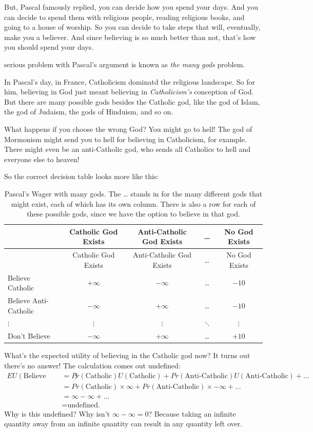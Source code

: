 \documentclass[justified]{tufte-book}
\renewcommand{\u}{U}
\newcommand{\p}{Pr}
\newcommand{\EU}{EU}
\theoremstyle{definition}
\theoremstyle{definition}
\theoremstyle{definition}
\theoremstyle{definition}
\theoremstyle{remark}
\begin{document}
But, Pascal famously replied, you can decide how you spend your days. And you can decide to spend them with religious people, reading religious books, and going to a house of worship. So you can decide to take steps that will, eventually, make you a believer. And since believing is so much better than not, that's how you should spend your days.

 serious problem with Pascal's argument is known as \emph{the many gods} problem.

In Pascal's day, in France, Catholicism dominatd the religious landscape. So for him, believing in God just meant believing in \emph{Catholicism's} conception of God. But there are many possible gods besides the Catholic god, like the god of Islam, the god of Judaism, the gods of Hinduism, and so on.

What happens if you choose the wrong God? You might go to hell! The god of Mormonism might send you to hell for believing in Catholicism, for example. There might even be an anti-Catholic god, who sends all Catholics to hell and everyone else to heaven!

So the correct decision table looks more like this:

\begin{longtable}[]{@{}lcccc@{}}
\caption{\label{tab:manygods}Pascal's Wager with many gods. The \ldots{} stands in for the many different gods that might exist, each of which has its own column. There is also a row for each of these possible gods, since we have the option to believe in that god.}\tabularnewline
\toprule
& Catholic God Exists & Anti-Catholic God Exists & \ldots{} & No God Exists \\
\midrule
\endfirsthead
\toprule
& Catholic God Exists & Anti-Catholic God Exists & \ldots{} & No God Exists \\
\midrule
\endhead
Believe Catholic & \(+\infty\) & \(-\infty\) & \ldots{} & \(-10\) \\
Believe Anti-Catholic & \(-\infty\) & \(+\infty\) & \ldots{} & \(-10\) \\
\(\vdots\) & \(\vdots\) & \(\vdots\) & \(\ddots\) & \(\vdots\) \\
Don't Believe & \(-\infty\) & \(+\infty\) & \ldots{} & \(+10\) \\
\bottomrule
\end{longtable}

What's the expected utility of believing in the Catholic god now? It turns out there's no answer! The calculation comes out undefined:
\[
  \begin{aligned}
  \EU(\mbox{Believe Catholic}) %
    &= \p(\mbox{Catholic})\u(\mbox{Catholic}) +%
       \p(\mbox{Anti-Catholic})\u(\mbox{Anti-Catholic}) + \ldots\\
    &= \p(\mbox{Catholic}) \times \infty + \p(\mbox{Anti-Catholic}) \times%
        -\infty + \ldots\\
    &= \infty - \infty + \ldots\\
    &= \mbox{undefined.}
  \end{aligned}
\]
Why is this undefined? Why isn't \(\infty - \infty = 0\)? Because taking an infinite quantity away from an infinite quantity can result in any quantity left over.
\end{document}
